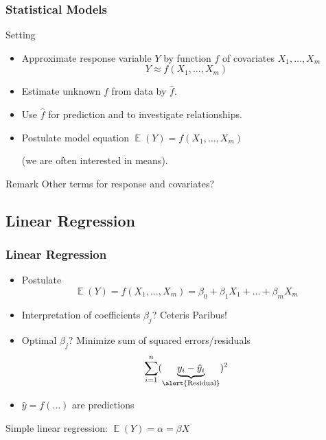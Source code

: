 \documentclass[
    utf8,
    aspectratio=169
]{beamer}  %
\DeclareMathOperator{\E}{\mathbb{E}}  %
\begin{document}
\begin{frame}
	\frametitle{Statistical Models}
	\begin{block}{Setting}
		\begin{itemize}
			\item Approximate \alert{response variable} $Y$ by function $f$ of \alert{covariates} $X_1,\dots,X_m$
			$$
				Y \approx f(X_1,\dots,X_m)
			$$
			\item Estimate unknown $f$ from data by $\hat f$.
			\item Use $\hat f$ for prediction and to investigate relationships.
			\item Postulate model equation $\E(Y) = f(X_1, \dots, X_m)$
			
			(we are often interested in means).
		\end{itemize}
	\end{block}
	
	\begin{block}{Remark}
		Other terms for response and covariates?
	\end{block}
\end{frame}

\subsection{Linear Regression}

\begin{frame}
	\frametitle{Linear Regression}
	\begin{itemize}
		\item Postulate 
		$$
			\E(Y) = f(X_1, \dots, X_m)=\beta_0 + \beta_1 X_1 + \dots + \beta_m X_m
		$$
		\item Interpretation of coefficients $\beta_j$? Ceteris Paribus!
		\item Optimal $\hat \beta_j$? Minimize sum of squared errors/residuals
		$$
			\sum_{i = 1}^n (\underbrace{y_i - \hat y_i}_{\text{\alert{Residual}}})^2 
		$$
		\item $\hat y = f(\dots)$ are \alert{predictions}
	\end{itemize}

	\vfill
	
	\begin{example}
		Simple linear regression: $\E(Y)=\alpha = \beta X$
	\end{example}
\end{frame}
\end{document}
